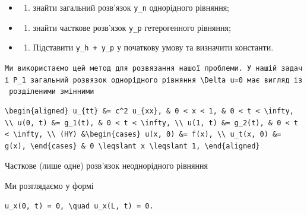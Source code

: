 \documentclass[
  ukrainian,
]{article}
\providecommand{\tightlist}{%
  \setlength{\itemsep}{0pt}\setlength{\parskip}{0pt}}
\begin{document}
\begin{itemize}
\tightlist
\item
  \begin{enumerate}
  \def\labelenumi{\arabic{enumi})}
  \tightlist
  \item
    знайти загальний розв'язок \texttt{y\_n} однорідного рівняння;
  \end{enumerate}
\item
  \begin{enumerate}
  \def\labelenumi{\arabic{enumi})}
  \setcounter{enumi}{1}
  \tightlist
  \item
    знайти часткове розв'язок \texttt{y\_p} гетерогенного рівняння;
  \end{enumerate}
\item
  \begin{enumerate}
  \def\labelenumi{\arabic{enumi})}
  \setcounter{enumi}{2}
  \tightlist
  \item
    Підставити \texttt{y\_h\ +\ y\_p} у початкову умову та визначити
    константи.
  \end{enumerate}
\end{itemize}

\texttt{Ми\ використаємо\ цей\ метод\ для\ розв\textquotesingle{}язання\ нашої\ проблеми.\ У\ нашій\ задачі\ \textquotesingle{}P\_1\textquotesingle{}\ загальний\ розв\textquotesingle{}язок\ однорідного\ рівняння\ \textquotesingle{}\textbackslash{}Delta\ u=0\textquotesingle{}\ має\ вигляд\ із\ розділеними\ змінними}

\begin{verbatim}
\begin{aligned} u_{tt} &= c^2 u_{xx}, & 0 < x < 1, & 0 < t < \infty, \\ u(0, t) &= g_1(t), & 0 < t < \infty, \\ u(1, t) &= g_2(t), & 0 < t < \infty, \\ (HY) &\begin{cases} u(x, 0) &= f(x), \\ u_t(x, 0) &= g(x), \end{cases} & 0 \leqslant x \leqslant 1, \end{aligned}
\end{verbatim}

Часткове (лише одне) розв'язок неоднорідного рівняння

Ми розглядаємо у формі

\begin{verbatim}
u_x(0, t) = 0, \quad u_x(L, t) = 0.
\end{verbatim}
\end{document}
